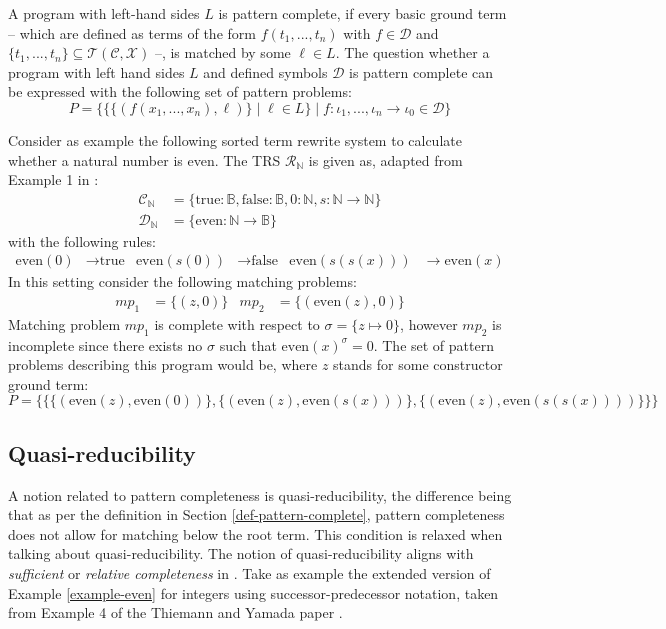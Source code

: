 A program with left-hand sides $L$ is pattern complete, if every basic ground term – which are defined as terms of the form $f(t_1, ..., t_n)$ with $f \in \mathcal{D}$ and $\{t_1, ..., t_n\} \subseteq \mathcal{T}(\mathcal{C}, \mathcal{X})$ –, is matched by some $\ell \in L$. The question whether a program with left hand sides $L$ and defined symbols $\mathcal{D}$ is pattern complete can be expressed with the following set of pattern problems\cite{thiemann}:
$$P = \{\{\{(f(x_1, ..., x_n), \ell)\} \mid \ell \in L\} \mid f: \iota_1, ..., \iota_n \rightarrow \iota_0 \in \mathcal{D}\}$$

\newpage
\begin{example} \label{example-even}
Consider as example the following sorted term rewrite system to calculate whether a natural number is even. The TRS $\mathcal{R}_\mathbb{N}$ is given as, adapted from Example 1 in \cite{thiemann}:
\begin{align*}
   \mathcal{C}_{\mathbb{N}} &= \{\text{true}: \mathbb{B}, \text{false}: \mathbb{B}, 0: \mathbb{N}, s: \mathbb{N} \rightarrow \mathbb{N}\} \\
\mathcal{D}_{\mathbb{N}} &= \{\text{even}: \mathbb{N} \rightarrow \mathbb{B}\} 
\end{align*}
with the following rules:
\begin{align*}
    \text{even}(0) &\rightarrow \text{true} & \text{even}(s(0)) &\rightarrow \text{false} & \text{even}(s(s(x))) &\rightarrow \text{even}(x)
\end{align*}
In this setting consider the following matching problems:
\begin{align*}
    mp_1 &= \{(z, 0)\} & mp_2 &= \{(\text{even}(z), 0)\}
\end{align*}
Matching problem $mp_1$ is complete with respect to $\sigma = \{z \mapsto 0\}$, however $mp_2$ is incomplete since there exists no $\sigma$ such that $\text{even}(x)^\sigma = 0$. The set of pattern problems describing this program would be, where $z$ stands for some constructor ground term: $$P = \{\{\{(\text{even}(z), \text{even}(0))\}, \{(\text{even}(z), \text{even}(s(x)))\}, \{(\text{even}(z), \text{even}(s(s(x))))\}\}\}$$
\end{example}

\subsection{Quasi-reducibility} \label{quasi-intro}
A notion related to pattern completeness is quasi-reducibility, the difference being that as per the definition in Section \ref{def-pattern-complete}, pattern completeness does not allow for matching below the root term. This condition is relaxed when talking about quasi-reducibility. The notion of quasi-reducibility aligns with \textit{sufficient} or \textit{relative completeness} in \cite{lazrek, thiel}.  Take as example the extended version of Example \ref{example-even} for integers using successor-predecessor notation, taken from Example 4 of the Thiemann and Yamada paper \cite{thiemann}.


